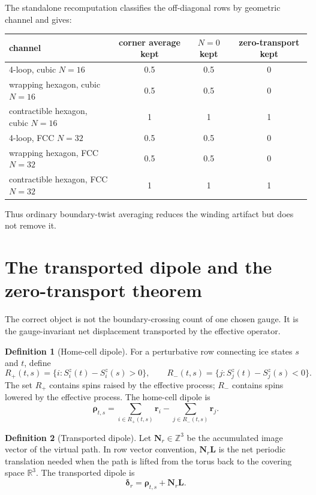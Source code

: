 \documentclass[11pt,letterpaper]{article}
\newcommand{\bN}{\bm N}
\newcommand{\bL}{\bm L}
\newcommand{\br}{\bm r}
\newcommand{\brho}{\bm \rho}
\newcommand{\bdelta}{\bm \delta}
\newcommand{\Z}{\mathbb Z}
\theoremstyle{plain}
\theoremstyle{definition}
\newtheorem{definition}{Definition}
\begin{document}
The standalone recomputation classifies the off-diagonal rows by geometric
channel and gives:
\begin{center}
\begin{tabular}{lccc}
\toprule
channel & corner average kept & $N=0$ kept & zero-transport kept \\
\midrule
4-loop, cubic $N=16$ & 0.5 & 0.5 & 0 \\
wrapping hexagon, cubic $N=16$ & 0.5 & 0.5 & 0 \\
contractible hexagon, cubic $N=16$ & 1 & 1 & 1 \\
4-loop, FCC $N=32$ & 0.5 & 0.5 & 0 \\
wrapping hexagon, FCC $N=32$ & 0.5 & 0.5 & 0 \\
contractible hexagon, FCC $N=32$ & 1 & 1 & 1 \\
\bottomrule
\end{tabular}
\end{center}
Thus ordinary boundary-twist averaging reduces the winding artifact but
does not remove it.

\section{The transported dipole and the zero-transport theorem}
\label{sec:transported-dipole}

The correct object is not the boundary-crossing count of one chosen gauge.
It is the gauge-invariant net displacement transported by the effective
operator.

\begin{definition}[Home-cell dipole]
For a perturbative row connecting ice states $s$ and $t$, define
\[
R_+(t,s)=\{i:S_i^z(t)-S_i^z(s)>0\},\qquad
R_-(t,s)=\{j:S_j^z(t)-S_j^z(s)<0\}.
\]
The set $R_+$ contains spins raised by the effective process; $R_-$ contains
spins lowered by the effective process.  The home-cell dipole is
\begin{equation}
\brho_{t,s}=\sum_{i\in R_+(t,s)}\br_i-\sum_{j\in R_-(t,s)}\br_j .
\label{eq:rho_def}
\end{equation}
\end{definition}

\begin{definition}[Transported dipole]
Let $\bN_r\in\Z^3$ be the accumulated image vector of the virtual path.  In row
vector convention, $\bN_r\bL$ is the net periodic translation needed when the
path is lifted from the torus back to the covering space $\mathbb R^3$.  The
transported dipole is
\begin{equation}
\boxed{
\bdelta_r=\brho_{t,s}+\bN_r\bL .
}
\label{eq:delta_def}
\end{equation}
\end{definition}
\end{document}
